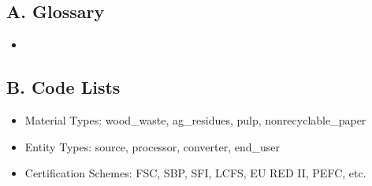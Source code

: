 \documentclass{article}
\begin{document}
\subsection*{A. Glossary}
\begin{itemize}[noitemsep]
    \item \textbf{}
\end{itemize}

\subsection*{B. Code Lists}
\begin{itemize}[noitemsep]
    \item Material Types: wood\_waste, ag\_residues, pulp, nonrecyclable\_paper
    \item Entity Types: source, processor, converter, end\_user
    \item Certification Schemes: FSC, SBP, SFI, LCFS, EU RED II, PEFC, etc. 
\end{itemize}
\end{document}
